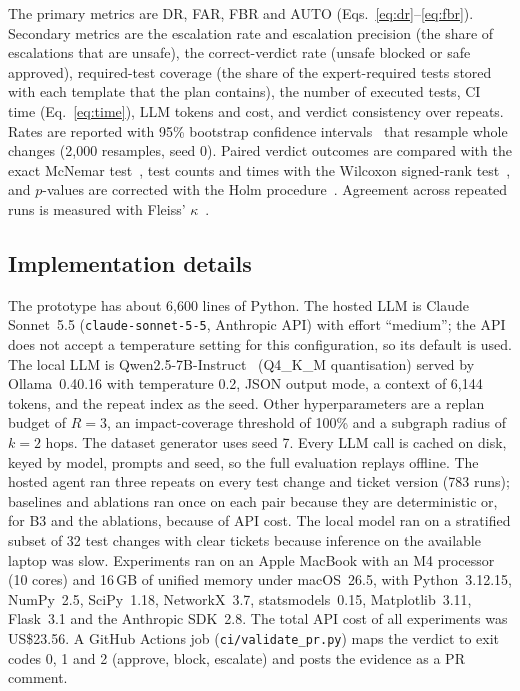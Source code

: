 \documentclass[pdflatex,iicol,sn-mathphys-num]{sn-jnl}%
\theoremstyle{thmstyletwo}%
\begin{document}
The primary metrics are DR, FAR, FBR and AUTO (Eqs.~\eqref{eq:dr}--\eqref{eq:fbr}). Secondary metrics are the escalation rate and escalation precision (the share of escalations that are unsafe), the correct-verdict rate (unsafe blocked or safe approved), required-test coverage (the share of the expert-required tests stored with each template that the plan contains), the number of executed tests, CI time (Eq.~\eqref{eq:time}), LLM tokens and cost, and verdict consistency over repeats. Rates are reported with 95\% bootstrap confidence intervals~\cite{efron1979bootstrap} that resample whole changes (2{,}000 resamples, seed 0). Paired verdict outcomes are compared with the exact McNemar test~\cite{mcnemar1947}, test counts and times with the Wilcoxon signed-rank test~\cite{wilcoxon1945}, and $p$-values are corrected with the Holm procedure~\cite{holm1979}. Agreement across repeated runs is measured with Fleiss' $\kappa$~\cite{fleiss1971}.

\subsection{Implementation details}\label{sec:impl}

The prototype has about 6{,}600 lines of Python. The hosted LLM is Claude Sonnet~5.5 (\texttt{claude-sonnet-5-5}, Anthropic API) with effort ``medium''; the API does not accept a temperature setting for this configuration, so its default is used. The local LLM is Qwen2.5-7B-Instruct~\cite{qwen2025qwen25} (Q4\_K\_M quantisation) served by Ollama~0.40.16 with temperature 0.2, JSON output mode, a context of 6{,}144 tokens, and the repeat index as the seed. Other hyperparameters are a replan budget of $R=3$, an impact-coverage threshold of 100\% and a subgraph radius of $k=2$ hops. The dataset generator uses seed 7. Every LLM call is cached on disk, keyed by model, prompts and seed, so the full evaluation replays offline. The hosted agent ran three repeats on every test change and ticket version (783 runs); baselines and ablations ran once on each pair because they are deterministic or, for B3 and the ablations, because of API cost. The local model ran on a stratified subset of 32 test changes with clear tickets because inference on the available laptop was slow. Experiments ran on an Apple MacBook with an M4 processor (10 cores) and 16\,GB of unified memory under macOS~26.5, with Python~3.12.15, NumPy~2.5, SciPy~1.18, NetworkX~3.7, statsmodels~0.15, Matplotlib~3.11, Flask~3.1 and the Anthropic SDK~2.8. The total API cost of all experiments was US\$23.56. A GitHub Actions job (\texttt{ci/validate\_pr.py}) maps the verdict to exit codes 0, 1 and 2 (approve, block, escalate) and posts the evidence as a PR comment.
\end{document}
